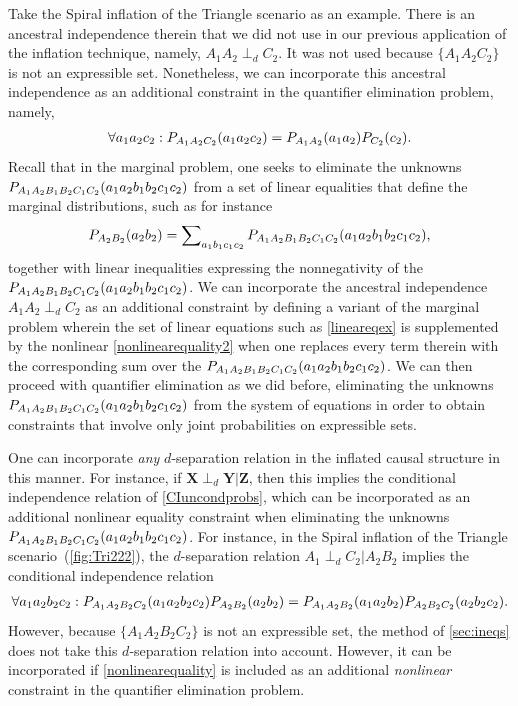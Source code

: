 \documentclass[aps,english,10pt,superscriptaddress,onecolumn,twoside,longbibliography,pra,floatfix,fleqn,nofootinbib]{revtex4-1}
\theoremstyle{definition}
\newcounter{example}[section]
\newcommand{\p}[2][]{{P_{#1}}\parenths{#2}}
\newcommand{\aindep}{\ensuremath{\perp_d}}
\DeclarePairedDelimiter{\parenths}{\lparen}{\rparen}
\begin{document}
Take the Spiral inflation of the Triangle scenario as an example.  There is an ancestral independence therein that we did not use in our previous application of the inflation technique, namely, $A_1 A_2 \perp_d C_2$.  It was not used because $\{A_1 A_2 C_2\}$ is not an expressible set.  Nonetheless, we can incorporate this ancestral independence as an additional constraint in the quantifier elimination problem, namely,
\begin{align}\label{nonlinearequality2}
\forall{a_1 a_2 c_2}: \p[A_1 A_2 C_2]{a_1 a_2 c_2}=\p[A_1 A_2 ]{a_1 a_2 }\p[ C_2]{c_2}.
\end{align}
Recall that in the marginal problem, one seeks to eliminate the unknowns $\p[A_1 A_2 B_1 B_2 C_1 C_2]{a_1 a_2 b_1 b_2 c_1 c_2}$ from a set of linear equalities that define the marginal distributions, such as for instance
\begin{align}\label{lineareqex}
\p[A_2 B_2]{a_2 b_2} = \sum\nolimits_{a_1 b_1 c_1 c_2}\p[A_1 A_2 B_1 B_2 C_1 C_2]{a_1 a_2 b_1 b_2 c_1 c_2},
\end{align}
together with linear inequalities expressing the nonnegativity of the $\p[A_1 A_2 B_1 B_2 C_1 C_2]{a_1 a_2 b_1 b_2 c_1 c_2}$.  
We can incorporate the ancestral independence $A_1 A_2 \perp_d C_2$ as an additional constraint by defining a variant of the marginal problem wherein the set of linear equations such as \cref{lineareqex} is supplemented by the nonlinear \cref{nonlinearequality2} when one replaces every term therein with the corresponding sum over the $\p[A_1 A_2 B_1 B_2 C_1 C_2]{a_1 a_2 b_1 b_2 c_1 c_2}$.  
We can then proceed with quantifier elimination as we did before, eliminating the unknowns $\p[A_1 A_2 B_1 B_2 C_1 C_2]{a_1 a_2 b_1 b_2 c_1 c_2}$ from the system of equations in order to obtain constraints that involve only joint probabilities on expressible sets.

One can incorporate {\em any} $d$-separation relation in the inflated causal structure in this manner.  For instance, if ${\bm X} \perp_d {\bm Y}| {\bm Z}$, then this implies the conditional independence relation of \cref{CIuncondprobs}, which can be incorporated as an additional nonlinear equality constraint when eliminating the unknowns $\p[A_1 A_2 B_1 B_2 C_1 C_2]{a_1 a_2 b_1 b_2 c_1 c_2}$. For instance, in the Spiral inflation of the Triangle scenario~(\cref{fig:Tri222}), the $d$-separation relation $A_1\aindep C_2|A_2 B_2$ implies the conditional independence relation
\begin{align}\label{nonlinearequality}
\forall{a_1 a_2 b_2 c_2}: \p[A_1 A_2 B_2 C_2]{a_1 a_2 b_2 c_2}\p[A_2 B_2]{a_2 b_2}=\p[A_1 A_2 B_2]{a_1 a_2 b_2}\p[A_2 B_2 C_2]{a_2 b_2 c_2}.
\end{align}
However, because $\{ A_1 A_2 B_2 C_2\}$ is not an expressible set, the method of \cref{sec:ineqs} does not take this $d$-separation relation into account.  However, it can be incorporated if \cref{nonlinearequality} is included as an additional {\em nonlinear} constraint in the quantifier elimination problem.  
\end{document}
